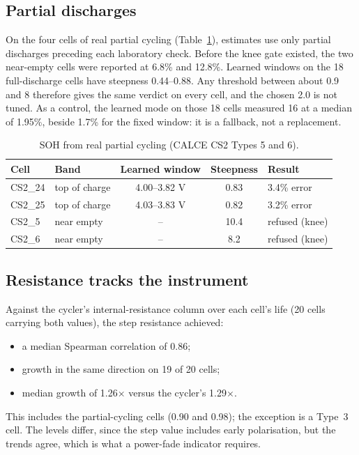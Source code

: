 \documentclass[preprint,12pt,authoryear]{elsarticle}
\begin{document}
\subsection{Partial discharges}
\label{sec:res-partial}

On the four cells of real partial cycling (Table~\ref{tab:partial}), estimates
use only partial discharges preceding each laboratory check. Before the knee
gate existed, the two near-empty cells were reported at 6.8\% and 12.8\%. Learned
windows on the 18 full-discharge cells have steepness 0.44--0.88. Any threshold
between about 0.9 and 8 therefore gives the same verdict on every cell, and the
chosen 2.0 is not tuned. As a control, the learned mode on those 18 cells
measured 16 at a median of 1.95\%, beside 1.7\% for the fixed window: it is a
fallback, not a replacement.

\begin{table}[t]
\centering
\caption{SOH from real partial cycling (CALCE CS2 Types 5 and 6).}
\label{tab:partial}
\begin{tabular}{llccl}
\toprule
Cell & Band & Learned window & Steepness & Result \\
\midrule
CS2\_24 & top of charge & 4.00--3.82 V & 0.83 & 3.4\% error \\
CS2\_25 & top of charge & 4.03--3.83 V & 0.82 & 3.2\% error \\
CS2\_5 & near empty & -- & 10.4 & refused (knee) \\
CS2\_6 & near empty & -- & 8.2 & refused (knee) \\
\bottomrule
\end{tabular}
\end{table}

\subsection{Resistance tracks the instrument}
\label{sec:res-r}

Against the cycler's internal-resistance column over each cell's life (20 cells
carrying both values), the step resistance achieved:
\begin{itemize}
\item a median Spearman correlation of 0.86;
\item growth in the same direction on 19 of 20 cells;
\item median growth of 1.26$\times$ versus the cycler's 1.29$\times$.
\end{itemize}
This includes the partial-cycling cells (0.90 and 0.98); the exception is a
Type~3 cell. The levels differ, since the step value includes early
polarisation, but the trends agree, which is what a power-fade indicator
requires.
\end{document}
